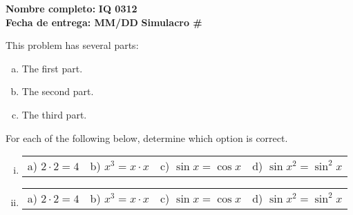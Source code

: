\documentclass[11pt,letterpaper]{article}
\newcommand{\homework}[2]{\noindent\textbf{Nombre completo: }\makebox[3in]{\hrulefill} \hfill \textbf{IQ 0312} \\  \textbf{Fecha de entrega: #2} \hfill \textbf{Simulacro #1}\\}
\begin{document}
\homework{\#}{MM/DD}


\begin{exercise}
This problem has several parts:
	\begin{enumerate}[(a)]
	\item The first part.
	\item The second part. 
	\item The third part. 
	\end{enumerate}
\end{exercise}



\begin{exercise}
For each of the following below, determine which option is correct.
\begin{enumerate}[(i)]
\item 
        \begin{tabular}{p{3cm}p{3cm}p{3cm}p{3cm}}
        a) $2 \cdot 2= 4$ & b) $x^3= x \cdot x$ & c) $\sin x = \cos x$ & d) $\sin x^2= \sin^2 x$
        \end{tabular} 
        \item
        \begin{tabular}{p{3cm}p{3cm}p{3cm}p{3cm}}
        a) $2 \cdot 2= 4$ & b) $x^3= x \cdot x$ & c) $\sin x = \cos x$ & d) $\sin x^2= \sin^2 x$
        \end{tabular} 
\end{enumerate}
\end{exercise}
\end{document}
